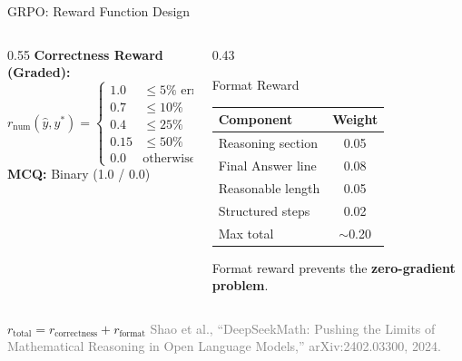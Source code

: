 \documentclass[10pt]{beamer}
\renewcommand{\footnotesize}{\tiny}
\begin{document}
\begin{frame}{GRPO: Reward Function Design}
\large
\begin{columns}[t]
    \begin{column}{0.55\linewidth}
        \textbf{Correctness Reward (Graded):}
        \[
            r_{\text{num}}(\hat{y}, y^*) = \begin{cases}
                1.0 & \leq 5\% \text{ error} \\
                0.7 & \leq 10\% \\
                0.4 & \leq 25\% \\
                0.15 & \leq 50\% \\
                0.0 & \text{otherwise}
            \end{cases}
        \]
        \vspace{0.2cm}
        \textbf{MCQ:} Binary (1.0 / 0.0)
    \end{column}
    \begin{column}{0.43\linewidth}
        \begin{block}{Format Reward}
            \footnotesize
            \begin{tabular}{lc}
                \toprule
                Component & Weight \\
                \midrule
                Reasoning section & 0.05 \\
                Final Answer line & 0.08 \\
                Reasonable length & 0.05 \\
                Structured steps & 0.02 \\
                \midrule
                Max total & $\sim$0.20 \\
                \bottomrule
            \end{tabular}
        \end{block}
        \vspace{0.1cm}
        {\footnotesize Format reward prevents the \textbf{zero-gradient problem}.}
    \end{column}
\end{columns}

\vspace{0.3cm}
\centering
$r_{\text{total}} = r_{\text{correctness}} + r_{\text{format}}$
\vspace{\fill}
{\tiny \textcolor{gray}{Shao et al., ``DeepSeekMath: Pushing the Limits of Mathematical Reasoning in Open Language Models,'' arXiv:2402.03300, 2024.}}
\end{frame}
\end{document}

